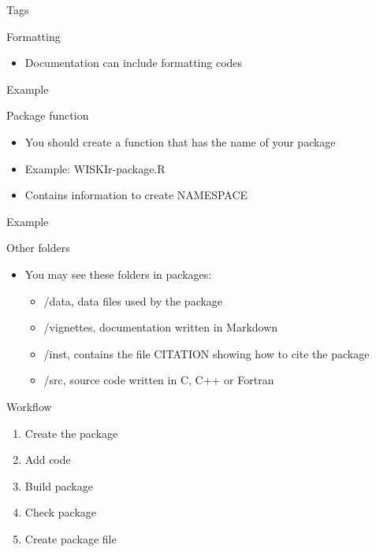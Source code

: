 \documentclass[
  ignorenonframetext,
  aspectratio=169]{beamer}
\providecommand{\tightlist}{%
  \setlength{\itemsep}{0pt}\setlength{\parskip}{0pt}}
\begin{document}
\begin{frame}{Tags}
\protect\hypertarget{tags}{}
\end{frame}

\begin{frame}{Formatting}
\protect\hypertarget{formatting}{}
\begin{itemize}
\tightlist
\item
  Documentation can include formatting codes
\end{itemize}
\end{frame}

\begin{frame}{Example}
\protect\hypertarget{example-1}{}
\end{frame}

\begin{frame}{Package function}
\protect\hypertarget{package-function}{}
\begin{itemize}
\tightlist
\item
  You should create a function that has the name of your package
\item
  Example: WISKIr-package.R
\item
  Contains information to create NAMESPACE
\end{itemize}
\end{frame}

\begin{frame}{Example}
\protect\hypertarget{example-2}{}
\end{frame}

\begin{frame}{Other folders}
\protect\hypertarget{other-folders}{}
\begin{itemize}
\tightlist
\item
  You may see these folders in packages:

  \begin{itemize}
  \tightlist
  \item
    /data, data files used by the package
  \item
    /vignettes, documentation written in Markdown
  \item
    /inst, contains the file CITATION showing how to cite the package
  \item
    /src, source code written in C, C++ or Fortran
  \end{itemize}
\end{itemize}
\end{frame}

\begin{frame}{Workflow}
\protect\hypertarget{workflow}{}
\begin{enumerate}
\tightlist
\item
  Create the package
\item
  Add code
\item
  Build package
\item
  Check package
\item
  Create package file
\end{enumerate}
\end{frame}
\end{document}
